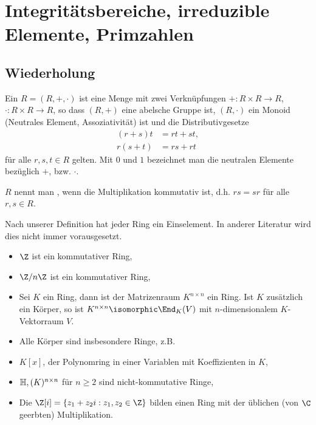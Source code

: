 \chapter{Integritätsbereiche, irreduzible Elemente, Primzahlen}

\section{Wiederholung}

\begin{df*}
	Ein  $R = (R, +, \cdot)$ ist eine Menge mit zwei Verknüpfungen $+: R \times R \to R$, $\cdot: R \times R \to R$, so dass $(R, +)$ eine abelsche Gruppe ist, $(R, \cdot)$ ein Monoid (Neutrales Element, Assoziativität) ist und die Distributivgesetze
	\begin{align*}
		(r+s)t &= rt + st, \\
		r(s+t) &= rs + rt
	\end{align*}
	für alle $r, s, t \in R$ gelten.
	Mit $0$ und $1$ bezeichnet man die neutralen Elemente bezüglich $+$, bzw. $\cdot$.

	$R$ nennt man , wenn die Multiplikation kommutativ ist, d.h. $rs = sr$ für alle $r,s \in R$.
	\begin{note}
		Nach unserer Definition hat jeder Ring ein Einselement.
		In anderer Literatur wird dies nicht immer vorausgesetzt.
	\end{note}
\end{df*}

\begin{ex*}
	\begin{itemize}
		\item
			$\Z$ ist ein kommutativer Ring,
		\item
			$\Z / n \Z$ ist ein kommutativer Ring,
		\item
			Sei $K$ ein Ring, dann ist der Matrizenraum $K^{n\times n}$ ein Ring.
			Ist $K$ zusätzlich ein Körper, so ist $K^{n\times n} \isomorphic \End_K(V)$ mit $n$-dimensionalem $K$-Vektorraum $V$.
		\item
			Alle Körper sind insbesondere Ringe, z.B.
			\begin{itemize*}[label=]
				\item
					$\Q$,
				\item
					$\R$,
				\item
					$\C$,
				\item
					$\Z / p \Z$ mit Primzahl $p$.
			\end{itemize*}
		\item
			$K[x]$, der Polynomring in einer Variablen mit Koeffizienten in $K$,
		\item
			$\mathbb{H}, (K)^{n\times n}$ für $n \ge 2$ sind nicht-kommutative Ringe,
		\item
			Die  $\Z[i] = \{ z_1 + z_2 i : z_1, z_2 \in \Z \}$ bilden einen Ring mit der üblichen (von $\C$ geerbten) Multiplikation.
	\end{itemize}
\end{ex*}

